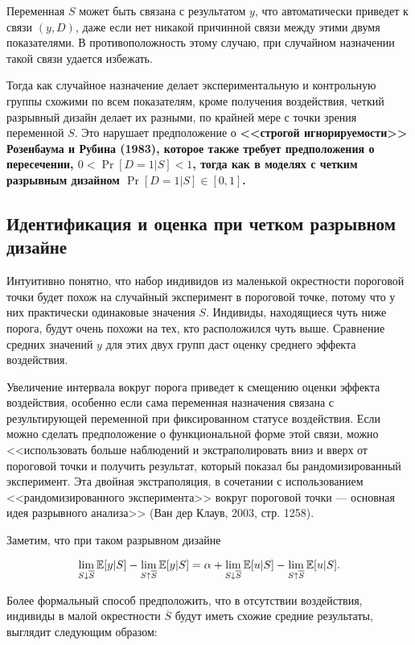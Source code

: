 Переменная $S$ может быть связана с результатом $y$, что автоматически приведет к связи $(y, D)$, даже если нет никакой причинной связи между этими двумя показателями. В противоположность этому случаю, при случайном назначении такой связи удается избежать. 

Тогда как случайное назначение делает экспериментальную и контрольную группы схожими по всем показателям, кроме получения воздействия, четкий разрывный дизайн делает их разными, по крайней мере с точки зрения переменной $S$. Это нарушает предположение о \bfseries <<строгой игнорируемости>> \mdseries Розенбаума и Рубина (1983), которое также требует предположения о пересечении, $0 < \Pr [D = 1 | S] < 1$, тогда как в моделях с четким разрывным дизайном $\Pr [D = 1|S] \in [0,1]$. 

\subsection{Идентификация и оценка при четком разрывном дизайне}

Интуитивно понятно, что набор индивидов из маленькой окрестности пороговой точки будет похож на случайный эксперимент в пороговой точке, потому что у них практически одинаковые значения $S$. Индивиды, находящиеся чуть ниже порога, будут очень похожи на тех, кто расположился чуть выше. Сравнение средних значений $y$ для этих двух групп даст оценку среднего эффекта воздействия. 

Увеличение интервала вокруг порога приведет к смещению оценки эффекта воздействия, особенно если сама переменная назначения связана с результирующей переменной при фиксированном статусе воздействия. Если можно сделать предположение о функциональной форме этой связи, можно <<использовать больше наблюдений и экстраполировать вниз и вверх от пороговой точки и получить результат, который показал бы рандомизированный эксперимент. Эта двойная экстраполяция, в сочетании с использованием <<рандомизированного эксперимента>> вокруг пороговой точки --- основная идея разрывного анализа>> (Ван дер Клаув, 2003, стр. 1258).

Заметим, что при таком разрывном дизайне

\begin{equation}
\label{eq25.58}
\lim_{S \downarrow \overline{S}} \mathbb{E}[y|S] - \lim_{S \uparrow \overline{S}} \mathbb{E}[y|S] = \alpha + \lim_{S \downarrow \overline{S}} \mathbb{E}[u|S] - \lim_{S \uparrow \overline{S}} \mathbb{E}[u|S].
\end{equation}

Более формальный способ предположить, что в отсутствии воздействия, индивиды в малой окрестности $\overline{S}$ будут иметь схожие средние результаты, выглядит следующим образом:

